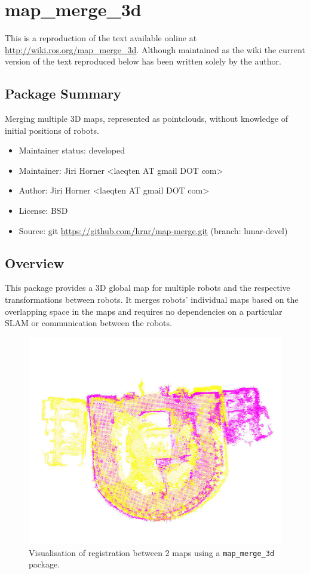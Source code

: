 \chapter{map\_merge\_3d}
\label{chap:map_merge-wiki}

This is a reproduction of the text available online at \url{http://wiki.ros.org/map_merge_3d}. Although maintained as the wiki the current version of the text reproduced below has been written solely by the author.

\section{Package Summary}

Merging multiple \gls{3D} maps, represented as pointclouds, without knowledge of initial positions of robots.

\begin{itemize}
    \item Maintainer status: developed
    \item Maintainer: Jiri Horner \textless laeqten AT gmail DOT com\textgreater
    \item Author: Jiri Horner \textless laeqten AT gmail DOT com\textgreater
    \item License: BSD
    \item Source: git \url{https://github.com/hrnr/map-merge.git} (branch: lunar-devel)
\end{itemize}


\section{Overview}

This package provides a \gls{3D} global map for multiple robots and the respective transformations between robots. It merges robots' individual maps based on the overlapping space in the maps and requires no dependencies on a particular \gls{SLAM} or communication between the robots.

\begin{figure}
    \centering
    \includegraphics[width=4.53in]{../img/screenshot.jpg}
    \caption[The merged map for $2$ robots.]{Visualisation of registration between $2$ maps using a \texttt{map\_merge\_3d} package.}
    \label{fig:mapmergescreenshot}
\end{figure}

